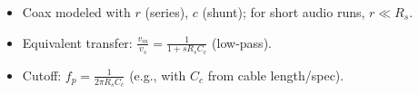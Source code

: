 \begin{tcolorbox}[colback=gray!10,colframe=black,title=Summary: Audio Cables as LPF]
\begin{itemize}
\item Coax modeled with $r$ (series), $c$ (shunt); for short audio runs, $r\ll R_s$.
\item Equivalent transfer: $\displaystyle \frac{v_{in}}{v_s}=\frac{1}{1+sR_s C_c}$ (low-pass).
\item Cutoff: $\displaystyle f_p=\frac{1}{2\pi R_s C_c}$ (e.g., with $C_c$ from cable length/spec).
\end{itemize}
\end{tcolorbox}
